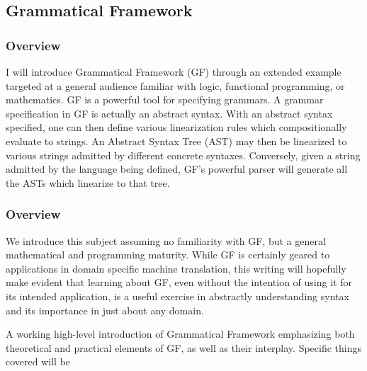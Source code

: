 \subsection{Grammatical Framework}

\subsubsection{Overview}

I will introduce Grammatical Framework (GF) through an extended example targeted
at a general audience familiar with logic, functional programming, or
mathematics. GF is a powerful tool for specifying grammars. A grammar
specification in GF is actually an abstract syntax. With an abstract syntax
specified, one can then define various linearization rules which compositionally
evaluate to strings. An Abstract Syntax Tree (AST) may then be linearized to
various strings admitted by different concrete syntaxes. Conversely, given a
string admitted by the language being defined, GF's powerful parser will
generate all the ASTs which linearize to that tree.

\subsubsection{Overview} %

We introduce this subject assuming no familiarity with GF, but a general
mathematical and programming maturity. While GF is certainly geared to
applications in domain specific machine translation, this writing will hopefully
make evident that learning about GF, even without the intention of using it for
its intended application, is a useful exercise in abstractly understanding
syntax and its importance in just about any domain.

A working high-level introduction of Grammatical Framework emphasizing both
theoretical and practical elements of GF, as well as their interplay. Specific
things covered will be

